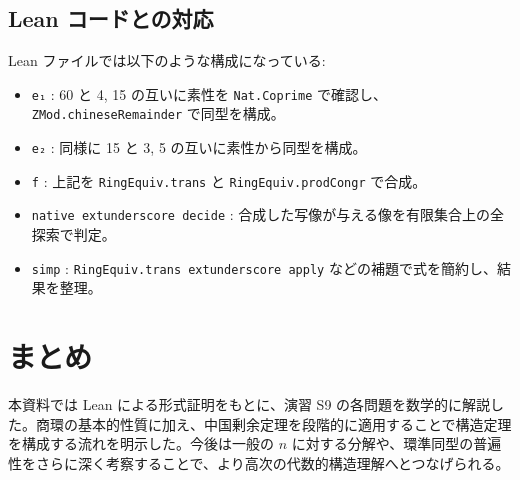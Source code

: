 \documentclass[luatex]{ltjsarticle}
\theoremstyle{definition}
\theoremstyle{remark}
\theoremstyle{plain}
\begin{document}
\subsection{Lean コードとの対応}
Lean ファイルでは以下のような構成になっている:
\begin{itemize}
  \item \texttt{e₁} : 60 と 4, 15 の互いに素性を \texttt{Nat.Coprime} で確認し、\texttt{ZMod.chineseRemainder} で同型を構成。
  \item \texttt{e₂} : 同様に 15 と 3, 5 の互いに素性から同型を構成。
  \item \texttt{f} : 上記を \texttt{RingEquiv.trans} と \texttt{RingEquiv.prodCongr} で合成。
  \item \texttt{native	extunderscore decide} : 合成した写像が与える像を有限集合上の全探索で判定。
  \item \texttt{simp} : \texttt{RingEquiv.trans	extunderscore apply} などの補題で式を簡約し、結果を整理。
\end{itemize}

\section{まとめ}
本資料では Lean による形式証明をもとに、演習 S9 の各問題を数学的に解説した。商環の基本的性質に加え、中国剰余定理を段階的に適用することで構造定理を構成する流れを明示した。今後は一般の \(n\) に対する分解や、環準同型の普遍性をさらに深く考察することで、より高次の代数的構造理解へとつなげられる。
\end{document}
